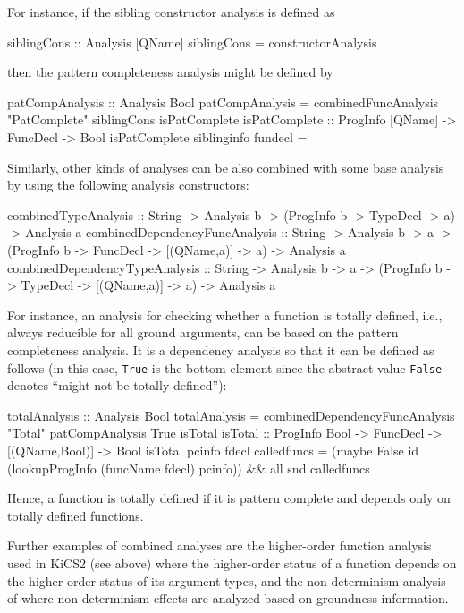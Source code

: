 \documentclass{llncs}
\newcommand{\code}[1]{\mbox{\small\texttt{#1}}}
\begin{document}
For instance, if the sibling constructor analysis is defined as
\begin{curry}
siblingCons :: Analysis [QName]
siblingCons = constructorAnalysis 
\end{curry}
then the pattern completeness analysis might be defined by
\begin{curry}
patCompAnalysis :: Analysis Bool
patCompAnalysis =
  combinedFuncAnalysis "PatComplete" siblingCons isPatComplete
isPatComplete :: ProgInfo [QName] -> FuncDecl -> Bool
isPatComplete siblinginfo fundecl = 
\end{curry}
Similarly, other kinds of analyses can be also combined with some base
analysis by using the following analysis constructors:
\begin{curry}
combinedTypeAnalysis :: String -> Analysis b
                  -> (ProgInfo  b -> TypeDecl -> a) -> Analysis a
combinedDependencyFuncAnalysis :: String -> Analysis b -> a
   -> (ProgInfo b -> FuncDecl -> [(QName,a)] -> a) -> Analysis a
combinedDependencyTypeAnalysis :: String -> Analysis b -> a
   -> (ProgInfo b -> TypeDecl -> [(QName,a)] -> a) -> Analysis a
\end{curry}
For instance, an analysis for checking whether a function
is totally defined, i.e., always reducible for all ground arguments,
can be based on the pattern completeness analysis.
It is a dependency analysis so that it can be defined as follows
(in this case, \code{True} is the bottom element since the
abstract value \code{False} denotes ``might not be totally defined''):
\begin{curry}
totalAnalysis :: Analysis Bool
totalAnalysis =
  combinedDependencyFuncAnalysis "Total" patCompAnalysis True isTotal
isTotal :: ProgInfo Bool -> FuncDecl -> [(QName,Bool)] -> Bool
isTotal pcinfo fdecl calledfuncs =
  (maybe False id (lookupProgInfo (funcName fdecl) pcinfo))
  && all snd calledfuncs
\end{curry}
Hence, a function is totally defined if it is pattern complete
and depends only on totally defined functions.

Further examples of combined analyses are the higher-order function
analysis used in KiCS2 (see above) where the higher-order status
of a function depends on the higher-order status of its argument types,
and the non-determinism analysis of \cite{BrasselHanus05}
where non-determinism effects are analyzed based on groundness
information.
\end{document}
